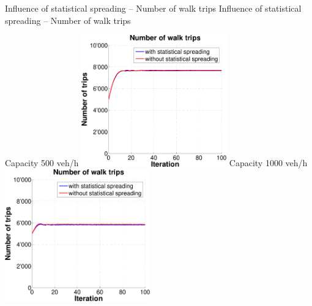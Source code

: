 {}

\createfigure%
{Influence of statistical spreading -- Number of walk trips}%
{Influence of statistical spreading -- Number of walk trips}%
{\label{fig:statisticalSpreadingNumWalkTrips}}%
{%
  \createsubfigure%
  {Capacity 500 veh/h}%
  {\includegraphics[width=0.47\textwidth, angle=0, trim=0mm 0mm 0mm 9mm, clip=true]{extending/figures/MultiModalSimulation/simulations/num_walk_trips_no_scatter_500}}%
  {\label{}}%
  {\hspace{3mm}}%
  \createsubfigure%
  {Capacity 1000 veh/h}%
  {\includegraphics[width=0.47\textwidth, angle=0, trim=0mm 0mm 0mm 9mm, clip=true]{extending/figures/MultiModalSimulation/simulations/num_walk_trips_no_scatter_1000}}%
  {\label{}}%
  {\vspace{7.5mm}}%

}
